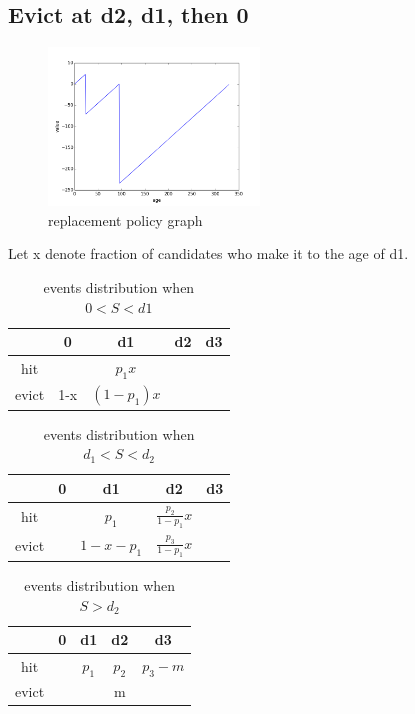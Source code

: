 \documentclass[12pt, letterpaper]{article}
\begin{document}
\subsection{Evict at d2, d1, then 0}

\begin{figure}[H]
\centering
\includegraphics[width=0.5\textwidth]{evict_d2_d1.png}
\caption{replacement policy graph}
\end{figure}

Let x denote fraction of candidates who make it to the age of d1.

\begin{table}[H]
\begin{center}
\begin{tabular}{c|c c c c}
\hline
 & 0 & d1 & d2 & d3 \\
 \hline
hit & & $p_1 x$ & \\
evict & 1-x & $(1-p_1) x$ & \\
\end{tabular}
\caption{events distribution when $0<S<d1$}
\end{center}
\end{table}

\begin{table}[H]
\begin{center}
\begin{tabular}{c|c c c c}
\hline
 & 0 & d1 & d2 & d3 \\
 \hline
hit & & $p_1$ & $\frac{p_2}{1-p_1}x$ &\\
evict & & $1-x-p_1$ & $\frac{p_3}{1-p_1}x$ & \\
\end{tabular}
\caption{events distribution when $d_1<S<d_2$}
\end{center}
\end{table}

\begin{table}[H]
\begin{center}
\begin{tabular}{c|c c c c}
\hline
 & 0 & d1 & d2 & d3 \\
 \hline
hit & & $p_1$ & $p_2$ & $p_3-m$ \\
evict & & & m & \\
\end{tabular}
\caption{events distribution when $S>d_2$}
\end{center}
\end{table}
\end{document}
